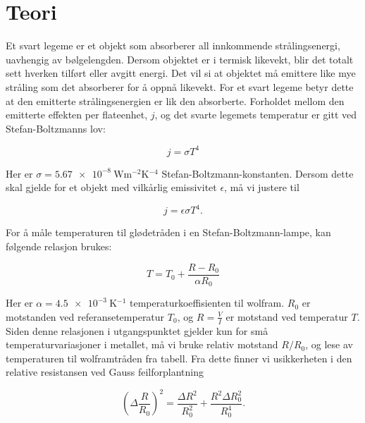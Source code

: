\section{Teori}
Et svart legeme er et objekt som absorberer all innkommende strålingsenergi, uavhengig av bølgelengden. Dersom objektet er i termisk likevekt, blir det totalt sett hverken tilført eller avgitt energi. Det vil si at objektet må emittere like mye stråling som det absorberer for å oppnå likevekt. For et svart legeme betyr dette at den emitterte strålingsenergien er lik den absorberte. Forholdet mellom den emitterte effekten per flateenhet, $j$, og det svarte legemets temperatur er gitt ved Stefan-Boltzmanns lov:

\begin{equation}
  j = \sigma T^4
\label{eq:SB} %
\end{equation}

Her er $\sigma = \SI{5,67e-8}{\watt\metre^{-2}\kelvin^{-4}}$ Stefan-Boltzmann-konstanten. Dersom dette skal gjelde for et objekt med vilkårlig emissivitet $\epsilon$, må vi justere til

\begin{equation}
  j = \epsilon\sigma T^4.
\label{eq:SBepsilon} %
\end{equation}

For å måle temperaturen til glødetråden i en Stefan-Boltzmann-lampe, kan følgende relasjon brukes:

\begin{equation}
  T=T_0+\frac{R-R_0}{\alpha R_0}
\label{eq:TempMetall} 
\end{equation}

Her er $\alpha=\SI{4,5e-3}{\kelvin^{-1}}$ temperaturkoeffisienten til wolfram. $R_0$ er motstanden ved referansetemperatur $T_0$, og $R=\frac{V}{I}$ er motstand ved temperatur $T$. Siden denne relasjonen i utgangspunktet gjelder kun for små temperaturvariasjoner i metallet, må vi bruke relativ motstand $R/R_0$, og lese av temperaturen til wolframtråden fra tabell. Fra dette finner vi usikkerheten i den relative resistansen ved Gauss feilforplantning

\begin{equation}
  \label{eq:ErrorRelRes}
  \left( \Delta \frac{R}{R_{0}} \right) ^{2} = \frac{\Delta R^{2}}{R_{0}^{2}} + \frac{R^{2} \Delta R_{0}^{2}}{R_{0}^{4}}.
\end{equation}

